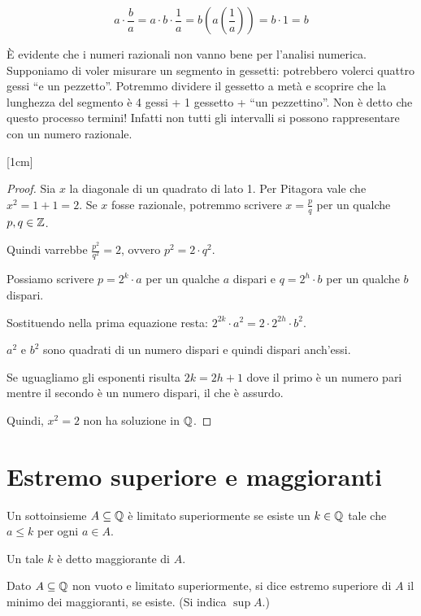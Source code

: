 \begin{equation*}
a \cdot \frac{b}{a} = a \cdot b \cdot \frac{1}{a} = b (a(\frac{1}{a})) = b \cdot 1 = b
\end{equation*}

È evidente che i numeri razionali non vanno bene per l'analisi numerica. Supponiamo di voler misurare un segmento in gessetti: potrebbero volerci quattro gessi ``e un pezzetto''. Potremmo dividere il gessetto a metà e scoprire che la lunghezza del segmento è 4 gessi + 1 gessetto + ``un pezzettino''. Non è detto che questo processo termini! Infatti non tutti gli intervalli si possono rappresentare con un numero razionale.  

[1cm]
\begin{proof}
Sia $x$ la diagonale di un quadrato di lato 1. Per Pitagora vale che $x^2 = 1 + 1 = 2$. Se $x$ fosse razionale, potremmo scrivere $x = \frac{p}{q}$ per un qualche $p,q \in \mathbb Z$. 

Quindi varrebbe $\frac{p^2}{q^2} = 2$, ovvero $p^2 = 2\cdot q^2$.

Possiamo scrivere $p = 2^k \cdot a$ per un qualche $a$ dispari e $q = 2^h \cdot b$ per un qualche $b$ dispari.

Sostituendo nella prima equazione resta: $2^{2k} \cdot a^2 = 2 \cdot 2^{2h} \cdot b^2$.

$a^2$ e $b^2$ sono quadrati di un numero dispari e quindi dispari anch'essi.

Se uguagliamo gli esponenti risulta $2k = 2h + 1$ dove il primo è un numero pari mentre il secondo è un numero dispari, il che è assurdo.

Quindi, $x^2 = 2$ non ha soluzione in $\mathbb Q$.
\end{proof}

\section{Estremo superiore e maggioranti}

\begin{definition}
Un sottoinsieme $A \subseteq \mathbb Q$ è limitato superiormente se esiste un $k \in \mathbb Q$ tale che $a \le k$ per ogni $a \in A$. 

Un tale $k$ è detto maggiorante di $A$.
\end{definition}

\begin{definition}
Dato $A \subseteq \mathbb Q$ non vuoto e limitato superiormente, si dice estremo superiore di $A$ il minimo dei maggioranti, se esiste. (Si indica $\sup A$.)
\end{definition}

